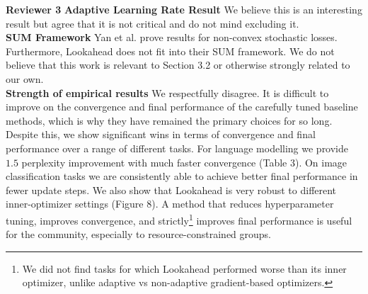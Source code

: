 \documentclass{article}
\begin{document}

\textbf{Reviewer 3} \hspace{0.1cm}
\textbf{Adaptive Learning Rate Result} We believe this is an interesting result but agree that it is not critical and do not mind excluding it.\\
\textbf{SUM Framework} Yan et al. prove results for non-convex stochastic losses. Furthermore, Lookahead does not fit into their SUM framework. We do not believe that this work is relevant to Section 3.2 or otherwise strongly related to our own.\\
\textbf{Strength of empirical results} We respectfully disagree. It is difficult to improve on the convergence and final performance of the carefully tuned baseline methods, which is why they have remained the primary choices for so long. Despite this, we show significant wins in terms of convergence and final performance over a range of different tasks. For language modelling we provide $1.5$ perplexity improvement with much faster convergence (Table 3). On image classification tasks we are consistently able to achieve better final performance in fewer update steps. We also show that Lookahead is very robust to different inner-optimizer settings (Figure 8). 
A method that reduces hyperparameter tuning, improves convergence, and strictly\footnote{We did not find tasks for which Lookahead performed worse than its inner optimizer, unlike adaptive vs non-adaptive gradient-based optimizers.} improves final performance is useful for the community, especially to resource-constrained groups.
\end{document}
